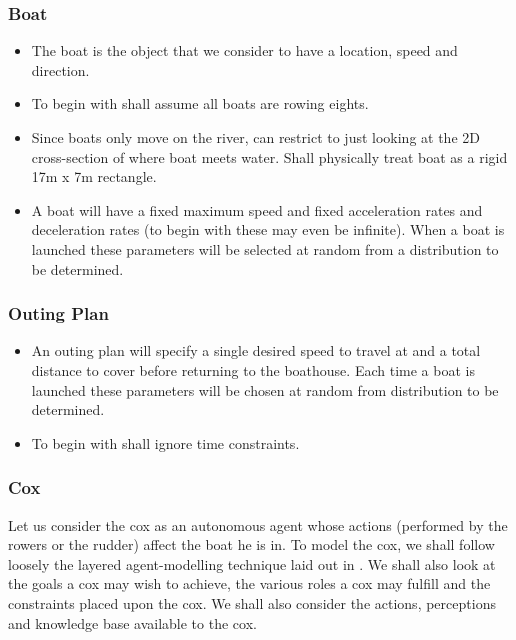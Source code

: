 \subsubsection{Boat}
\begin{itemize}
  \item The boat is the object that we consider to have a location, speed and direction.
  \item To begin with shall assume all boats are rowing eights.
  \item Since boats only move on the river, can restrict to just looking at the 2D cross-section of where boat
    meets water. Shall physically treat boat as a rigid 17m x 7m rectangle.
  \item A boat will have a fixed maximum speed and fixed acceleration
    rates and deceleration rates (to begin with these may even be
    infinite). When a boat is launched these parameters will be
    selected at random from a distribution to be determined.
\end{itemize}

\subsubsection{Outing Plan}
\begin{itemize}
  \item An outing plan will specify a single desired speed to travel at
    and a total distance to cover before returning to the
    boathouse. Each time a boat is launched these parameters will be
    chosen at random from distribution to be determined.
  \item To begin with shall ignore time constraints.
\end{itemize}

\subsubsection{Cox}
Let us consider the cox as an autonomous agent whose actions
(performed by the rowers or the rudder) affect the boat he is in. To
model the cox, we shall follow loosely the layered agent-modelling
technique laid out in \cite{Sterling2009}. We shall also look at the
goals a cox may wish to achieve, the various roles a cox may fulfill
and the constraints placed upon the cox. We shall also consider the
actions, perceptions and knowledge base available to the cox.

